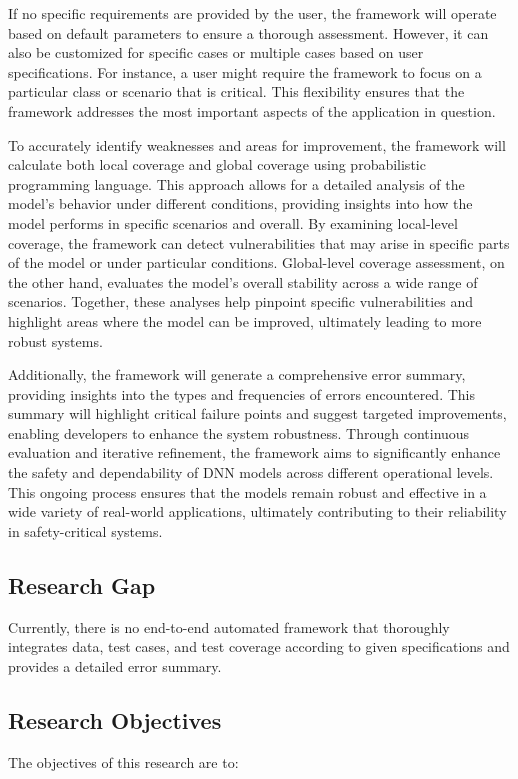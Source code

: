 If no specific requirements are provided by the user, the framework will operate based on default parameters to ensure a thorough assessment. However, it can also be customized for specific cases or multiple cases based on user specifications. For instance, a user might require the framework to focus on a particular class or scenario that is critical. This flexibility ensures that the framework addresses the most important aspects of the application in question.

To accurately identify weaknesses and areas for improvement, the framework will calculate both local coverage and global coverage using probabilistic programming language. This approach allows for a detailed analysis of the model's behavior under different conditions, providing insights into how the model performs in specific scenarios and overall. By examining local-level coverage, the framework can detect vulnerabilities that may arise in specific parts of the model or under particular conditions. Global-level coverage assessment, on the other hand, evaluates the model's overall stability across a wide range of scenarios. Together, these analyses help pinpoint specific vulnerabilities and highlight areas where the model can be improved, ultimately leading to more robust systems.

Additionally, the framework will generate a comprehensive error summary, providing insights into the types and frequencies of errors encountered. This summary will highlight critical failure points and suggest targeted improvements, enabling developers to enhance the system robustness.
Through continuous evaluation and iterative refinement, the framework aims to significantly enhance the safety and dependability of DNN models across different operational levels. This ongoing process ensures that the models remain robust and effective in a wide variety of real-world applications, ultimately contributing to their reliability in safety-critical systems.

\subsection{Research Gap}
Currently, there is no end-to-end automated framework that thoroughly integrates data, test cases, and test coverage according to given specifications and provides a detailed error summary.

\subsection{Research Objectives}
The objectives of this research are to:

